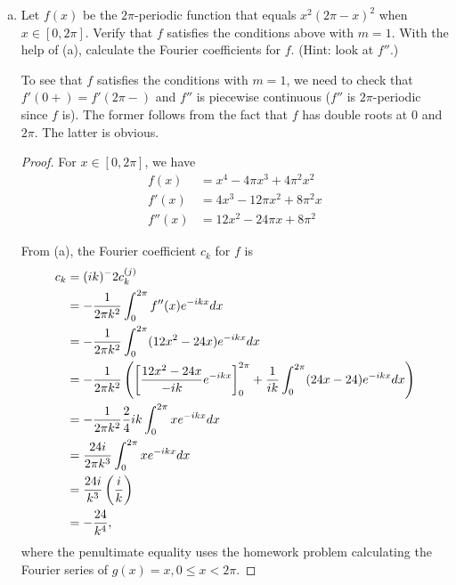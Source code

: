 \documentclass{article}
\begin{document}
\begin{enumerate}[(a)]
\item Let $f(x)$ be the $2\pi$-periodic function that equals $x^2(2 \pi - x)^2$ when $x \in [0,2 \pi]$. Verify that $f$ satisfies the conditions above with $m = 1$. With the help of (a), calculate the Fourier coefficients for $f$. (Hint: look at $f''$.)

To see that $f$ satisfies the conditions with $m=1$, we need to check that  $f'(0+) = f'(2\pi -)$ and $f''$ is piecewise continuous ($f''$ is $2 \pi$-periodic since $f$ is). The former follows from the fact that $f$ has double roots at $0$ and $2 \pi$.  The latter is obvious.

\begin{proof}
For $x \in [0, 2\pi]$, we have 
\begin{align*}
f(x) & = x^4 - 4 \pi x^3 + 4 \pi^2 x^2
\\ f'(x) & = 4x^3 - 12 \pi x^2 + 8 \pi^2 x
\\ f''(x) & = 12x^2 - 24 \pi x + 8 \pi^2 
\end{align*}

From (a), the Fourier coefficient $c_k$ for $f$ is
\begin{align*}
c_k & = (ik)^-2 c_k^{(j)}
\\  & = -\frac 1 {2 \pi k^2} \int_0^{2\pi} f''(x) e^{-ikx} dx
\\  & = -\frac 1 {2 \pi k^2} \int_0^{2\pi} (12x^2 - 24x) e^{-ikx} dx
\\  & = -\frac {1} {2 \pi k^2}  \left( \left[ \frac{12x^2 - 24x}{-ik} e^{-ikx}\right]_0^{2\pi}  + \frac 1 {ik} \int_0^{2 \pi} (24x - 24)e^{-ikx} dx \right)
\\  & = -\frac {1} {2 \pi k^2}  \frac 24 {ik} \int_0^{2 \pi} xe^{-ikx} dx
\\  & = \frac {24i} {2 \pi k^3} \int_0^{2\pi} x e^{-ikx} dx
\\  & = \frac {24i} {k^3} \left( \frac i k \right)
\\ & = - \frac{24} {k^4},
\end{align*}
where the penultimate equality uses the homework problem calculating the Fourier series of $g(x) = x, 0 \le x < 2 \pi$.
\end{proof}


\end{enumerate}
\end{document}
